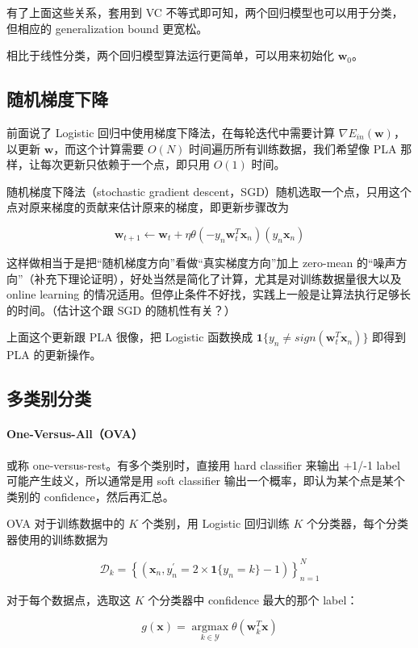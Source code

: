 \documentclass[a4paper]{article}
\begin{document}
有了上面这些关系，套用到 VC 不等式即可知，两个回归模型也可以用于分类，但相应的 generalization bound 更宽松。

相比于线性分类，两个回归模型算法运行更简单，可以用来初始化 $\mathbf{w}_0$。


\subsection{随机梯度下降}
前面说了 Logistic 回归中使用梯度下降法，在每轮迭代中需要计算 $\nabla E_{in}(\mathbf{w})$，以更新 $\mathbf{w}$，而这个计算需要 $O(N)$ 时间遍历所有训练数据，我们希望像 PLA 那样，让每次更新只依赖于一个点，即只用 $O(1)$ 时间。

随机梯度下降法（stochastic gradient descent，SGD）随机选取一个点，只用这个点对原来梯度的贡献来估计原来的梯度，即更新步骤改为

$$\mathbf{w}_{t+1} \leftarrow \mathbf{w}_t + \eta\theta(-y_n\mathbf{w}_t^T\mathbf{x}_n)(y_n\mathbf{x}_n)$$

这样做相当于是把“随机梯度方向”看做“真实梯度方向”加上 zero-mean 的“噪声方向”（补充下理论证明），好处当然是简化了计算，尤其是对训练数据量很大以及 online learning 的情况适用。但停止条件不好找，实践上一般是让算法执行足够长的时间。（估计这个跟 SGD 的随机性有关？）

上面这个更新跟 PLA 很像，把 Logistic 函数换成 $\mathbf{1}\{y_n \neq sign(\mathbf{w}_t^T\mathbf{x}_n)\}$ 即得到 PLA 的更新操作。


\subsection{多类别分类}
\paragraph{One-Versus-All（OVA）} 或称 one-versus-rest。有多个类别时，直接用 hard classifier 来输出 +1/-1 label 可能产生歧义，所以通常是用 soft classifier 输出一个概率，即认为某个点是某个类别的 confidence，然后再汇总。

OVA 对于训练数据中的 $K$ 个类别，用 Logistic 回归训练 $K$ 个分类器，每个分类器使用的训练数据为

$$\mathcal{D}_k = \left \{ (\mathbf{x}_n, y_n^{\prime} = 2 \times \mathbf{1}\{y_n = k\} - 1) \right \}_{n=1}^{N}$$

对于每个数据点，选取这 $K$ 个分类器中 confidence 最大的那个 label：

$$g(\mathbf{x}) = \operatorname*{argmax}_{k \in \mathcal{Y}}\theta(\mathbf{w}_k^T\mathbf{x})$$
\end{document}
